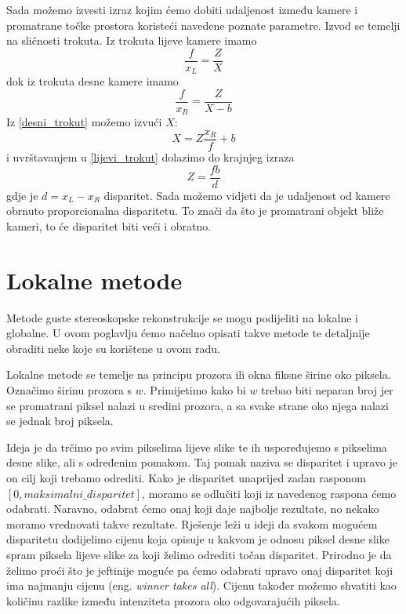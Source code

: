 \documentclass[utf8, zavrsni, numeric]{fer}
\begin{document}
Sada možemo izvesti izraz kojim ćemo dobiti udaljenost između kamere i promatrane točke prostora
koristeći navedene poznate parametre. Izvod se temelji na sličnosti trokuta. Iz trokuta lijeve kamere imamo
\begin{equation}
\frac{f}{x_L} = \frac{Z}{X} \label{lijevi_trokut}
\end{equation}
dok iz trokuta desne kamere imamo
\begin{equation}
\frac{f}{x_R} = \frac{Z}{X - b} \label{desni_trokut}
\end{equation}
Iz \ref{desni_trokut} možemo izvući $X$:
\begin{equation}
X = Z\frac{x_R}{f} + b \label{desni_x}
\end{equation}
i uvrštavanjem u \ref{lijevi_trokut} dolazimo do krajnjeg izraza
\begin{equation}
Z = \frac{fb}{d} \label{udaljenost}
\end{equation}
gdje je $d = x_L - x_R$ disparitet.
Sada možemo vidjeti da je udaljenost od kamere obrnuto proporcionalna disparitetu. To znači da što
je promatrani objekt bliže kameri, to će disparitet biti veći i obratno.

\chapter{Lokalne metode}
Metode guste stereoskopske rekonstrukcije se mogu podijeliti na lokalne i globalne. U ovom poglavlju ćemo načelno opisati takve metode te detaljnije obraditi neke koje su korištene u ovom radu.

Lokalne metode se temelje na principu prozora ili okna fiksne širine oko piksela. Označimo širinu prozora s $w$. Primijetimo kako bi $w$ trebao biti neparan broj jer se promatrani piksel
nalazi u sredini prozora, a sa svake strane oko njega nalazi se jednak broj piksela.

Ideja je da trčimo po svim pikselima lijeve slike te ih uspoređujemo s pikselima desne slike, ali
s određenim pomakom. Taj pomak naziva se disparitet i upravo je on cilj koji trebamo odrediti.
Kako je disparitet unaprijed zadan rasponom $[0, maksimalni\_disparitet]$, moramo se odlučiti
koji iz navedenog raspona ćemo odabrati. Naravno, odabrat ćemo onaj koji daje najbolje rezultate, no nekako moramo vrednovati takve rezultate. Rješenje leži u ideji da svakom mogućem
disparitetu dodijelimo cijenu koja opisuje u kakvom je odnosu piksel desne slike spram piksela
lijeve slike za koji želimo odrediti točan disparitet. Prirodno je da želimo proći što je
jeftinije moguće pa ćemo odabrati upravo onaj disparitet koji ima najmanju cijenu (eng. {\sl winner takes all}). Cijenu
također možemo shvatiti kao količinu razlike između intenziteta prozora oko odgovarajućih piksela.
\end{document}
